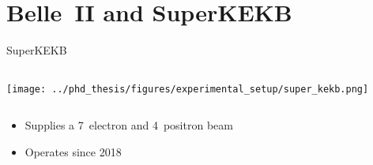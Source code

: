 \documentclass[xcolor=dvipsnames]{beamer}
\begin{document}


   \section{Belle~II and SuperKEKB}

   \begin{frame}{SuperKEKB}
      \scriptsize\centering
      \begin{columns}
         \texttt{[image: ../phd\_thesis/figures/experimental\_setup/super\_kekb.png]}
      \end{columns}

      \vspace{10pt}

      \begin{itemize}
         \item Supplies a 7~\gev electron and 4~\gev positron beam
         \item Operates since 2018
      \end{itemize}
   \end{frame}
\end{document}

